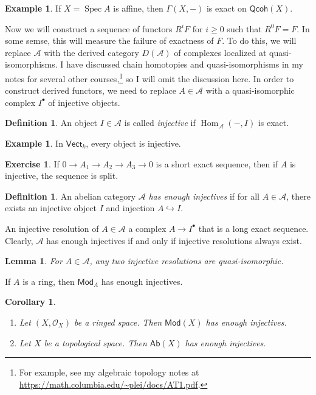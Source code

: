\documentclass[leqno, openany]{memoir}
\newtheorem{cor}[thm]{Corollary}
\newtheorem{lem}[thm]{Lemma}
\theoremstyle{definition}
\newtheorem{defn}[thm]{Definition}
\newtheorem{exm}[thm]{Example}
\newtheorem{exer}[thm]{Exercise}
\theoremstyle{remark}
\theoremstyle{plain}
\theoremstyle{definition}
\theoremstyle{remark}
\newcommand{\mc}[1]{\mathcal{#1}}
\newcommand{\ms}[1]{\mathsf{#1}}
\DeclareMathOperator{\Hom}{Hom}
\DeclareMathOperator{\Spec}{Spec}
\begin{document}
\begin{exm} If $X = \Spec A$ is affine, then $\Gamma(X, -)$ is exact on
$\ms{Qcoh}(X)$.  \end{exm}

Now we will construct a sequence of functors $R^i F$ for $i \geq 0$ such that
$R^0 F = F$. In some semse, this will measure the failure of exactness of $F$.
To do this, we will replace $\mc{A}$ with the derived category $D(\mc{A})$ of
complexes localized at quasi-isomorphisms. I have discussed chain homotopies
and quasi-isomorphisms in my notes for several other courses,\footnote{For
example, see my algebraic topology notes at
\url{https://math.columbia.edu/~plei/docs/AT1.pdf}.} so I will omit the
discussion here. In order to construct derived functors, we need to replace $A
\in \mc{A}$ with a quasi-isomorphic complex $I^{\bullet}$ of injective objects.

\begin{defn} An object $I \in \mc{A}$ is called \textit{injective} if
$\Hom_{\mc{A}}(-, I)$ is exact.  \end{defn}

\begin{exm} In $\ms{Vect}_k$, every object is injective.  \end{exm}

\begin{exer} If $0 \to A_1 \to A_2 \to A_3 \to 0$ is a short exact sequence,
then if $A$ is injective, the sequence is split.  \end{exer}

\begin{defn} An abelian category $\mc{A}$ \textit{has enough injectives} if for
all $A \in \mc{A}$, there exists an injective object $I$ and injection $A
\hookrightarrow I$.  \end{defn}

An injective resolution of $A \in \mc{A}$ a complex $A \to I^{\bullet}$ that is
a long exact sequence. Clearly, $\mc{A}$ has enough injectives if and only if
injective resolutions always exist.

\begin{lem} For $A \in \mc{A}$, any two injective resolutions are
quasi-isomorphic.  \end{lem}

If $A$ is a ring, then $\ms{Mod}_A$ has enough injectives.

\begin{cor}\leavevmode \begin{enumerate} \item Let $(X, \mc{O}_X)$ be a ringed
space. Then $\ms{Mod}(X)$ has enough injectives.  \item Let $X$ be a
topological space. Then $\ms{Ab}(X)$ has enough injectives.  \end{enumerate}
\end{cor}
\end{document}
